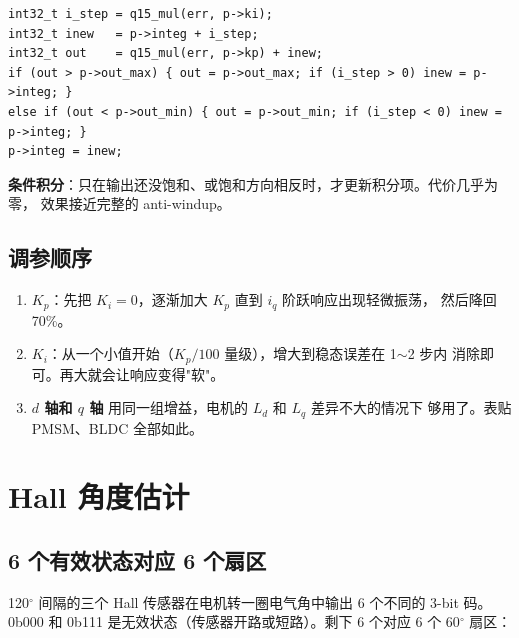\documentclass[UTF8,a4paper,11pt]{ctexart}
\begin{document}
\begin{lstlisting}
int32_t i_step = q15_mul(err, p->ki);
int32_t inew   = p->integ + i_step;
int32_t out    = q15_mul(err, p->kp) + inew;
if (out > p->out_max) { out = p->out_max; if (i_step > 0) inew = p->integ; }
else if (out < p->out_min) { out = p->out_min; if (i_step < 0) inew = p->integ; }
p->integ = inew;
\end{lstlisting}

\textbf{条件积分}：只在输出还没饱和、或饱和方向相反时，才更新积分项。代价几乎为零，
效果接近完整的 anti-windup。

\subsection{调参顺序}

\begin{enumerate}
  \item \textbf{$K_p$}：先把 $K_i = 0$，逐渐加大 $K_p$ 直到 $i_q$ 阶跃响应出现轻微振荡，
        然后降回 70\%。
  \item \textbf{$K_i$}：从一个小值开始（$K_p / 100$ 量级），增大到稳态误差在 1$\sim$2 步内
        消除即可。再大就会让响应变得"软"。
  \item \textbf{$d$ 轴和 $q$ 轴} 用同一组增益，电机的 $L_d$ 和 $L_q$ 差异不大的情况下
        够用了。表贴 PMSM、BLDC 全部如此。
\end{enumerate}

\section{Hall 角度估计}

\subsection{6 个有效状态对应 6 个扇区}

120$^\circ$ 间隔的三个 Hall 传感器在电机转一圈电气角中输出 6 个不同的 3-bit 码。
0b000 和 0b111 是无效状态（传感器开路或短路）。剩下 6 个对应 6 个 60$^\circ$ 扇区：
\end{document}
